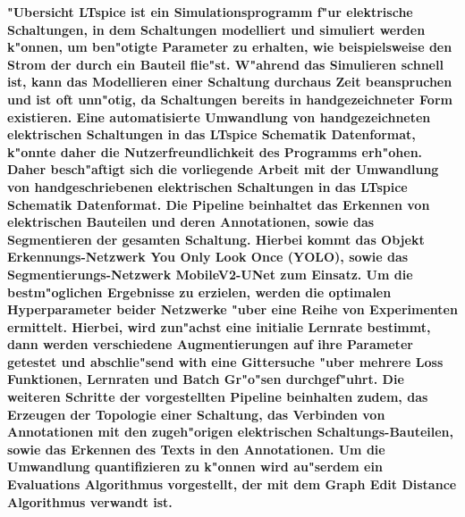 \bfseries
{"Ubersicht}
\normalfont
LTspice ist ein Simulationsprogramm f"ur elektrische Schaltungen, in dem Schaltungen modelliert und simuliert werden k"onnen, um ben"otigte Parameter zu erhalten, wie beispielsweise den Strom der durch ein Bauteil flie"st.
W"ahrend das Simulieren schnell ist, kann das Modellieren einer Schaltung durchaus Zeit beanspruchen und ist oft unn"otig, da Schaltungen bereits in handgezeichneter Form existieren.
Eine automatisierte Umwandlung von handgezeichneten elektrischen Schaltungen in das LTspice Schematik Datenformat, k"onnte daher die Nutzerfreundlichkeit des Programms erh"ohen.
Daher besch"aftigt sich die vorliegende Arbeit mit der Umwandlung von handgeschriebenen elektrischen Schaltungen in das LTspice Schematik Datenformat.
Die Pipeline beinhaltet das Erkennen von elektrischen Bauteilen und deren Annotationen, sowie das Segmentieren der gesamten Schaltung.
Hierbei kommt das Objekt Erkennungs-Netzwerk You Only Look Once (YOLO), sowie das Segmentierungs-Netzwerk MobileV2-UNet zum Einsatz.
Um die bestm"oglichen Ergebnisse zu erzielen, werden die optimalen Hyperparameter beider Netzwerke "uber eine Reihe von Experimenten ermittelt.
Hierbei, wird zun"achst eine initialie Lernrate bestimmt, dann werden verschiedene Augmentierungen auf ihre Parameter getestet und abschlie"send with eine Gittersuche "uber mehrere Loss Funktionen, Lernraten und Batch Gr"o"sen durchgef"uhrt.
Die weiteren Schritte der vorgestellten Pipeline beinhalten zudem, das Erzeugen der Topologie einer Schaltung, das Verbinden von Annotationen mit den zugeh"origen elektrischen Schaltungs-Bauteilen, sowie das Erkennen des Texts in den Annotationen.
Um die Umwandlung quantifizieren zu k"onnen wird au"serdem ein Evaluations Algorithmus vorgestellt, der mit dem Graph Edit Distance Algorithmus \cite{graph_edit_distance} verwandt ist.




